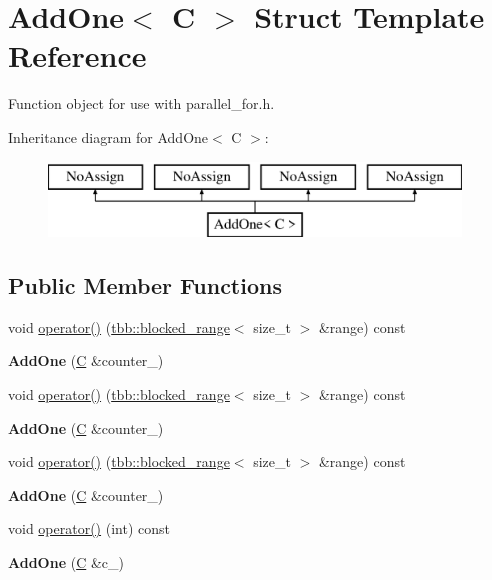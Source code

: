 \hypertarget{structAddOne}{}\section{Add\+One$<$ C $>$ Struct Template Reference}
\label{structAddOne}


Function object for use with parallel\+\_\+for.\+h.  


Inheritance diagram for Add\+One$<$ C $>$\+:\begin{figure}[H]
\begin{center}
\leavevmode
\includegraphics[height=2.000000cm]{structAddOne}
\end{center}
\end{figure}
\subsection*{Public Member Functions}
\begin{DoxyCompactItemize}
\item 
void \hyperlink{structAddOne_ab6d6142af3c0a8acc550a987e1d9a070}{operator()} (\hyperlink{classtbb_1_1blocked__range}{tbb\+::blocked\+\_\+range}$<$ size\+\_\+t $>$ \&range) const 
\item 
\hypertarget{structAddOne_a717d41e6e62850b2225d77f1c67e179a}{}{\bfseries Add\+One} (\hyperlink{classC}{C} \&counter\+\_\+)\label{structAddOne_a717d41e6e62850b2225d77f1c67e179a}

\item 
void \hyperlink{structAddOne_ab6d6142af3c0a8acc550a987e1d9a070}{operator()} (\hyperlink{classtbb_1_1blocked__range}{tbb\+::blocked\+\_\+range}$<$ size\+\_\+t $>$ \&range) const 
\item 
\hypertarget{structAddOne_a717d41e6e62850b2225d77f1c67e179a}{}{\bfseries Add\+One} (\hyperlink{classC}{C} \&counter\+\_\+)\label{structAddOne_a717d41e6e62850b2225d77f1c67e179a}

\item 
void \hyperlink{structAddOne_ab6d6142af3c0a8acc550a987e1d9a070}{operator()} (\hyperlink{classtbb_1_1blocked__range}{tbb\+::blocked\+\_\+range}$<$ size\+\_\+t $>$ \&range) const 
\item 
\hypertarget{structAddOne_a717d41e6e62850b2225d77f1c67e179a}{}{\bfseries Add\+One} (\hyperlink{classC}{C} \&counter\+\_\+)\label{structAddOne_a717d41e6e62850b2225d77f1c67e179a}

\item 
void \hyperlink{structAddOne_a010a2ce50abe82b857656db042bbc677}{operator()} (int) const 
\item 
\hypertarget{structAddOne_a2b1fb56209418a13020eb11644b001d4}{}{\bfseries Add\+One} (\hyperlink{classC}{C} \&c\+\_\+)\label{structAddOne_a2b1fb56209418a13020eb11644b001d4}

\end{DoxyCompactItemize}
